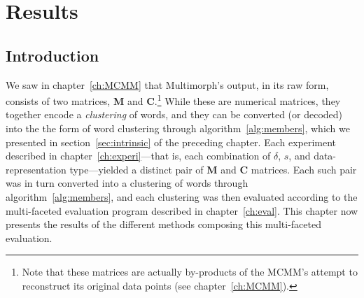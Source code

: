 \chapter{Results}
\label{ch:results}

\section{Introduction}


We saw in chapter~\ref{ch:MCMM} that Multimorph's output, in its raw form,
consists of two matrices, $\mathbf{M}$ and $\mathbf{C}$.\footnote{Note that these 
matrices are actually by-products of the MCMM's attempt to reconstruct its original 
data points (see chapter~\ref{ch:MCMM}).} While these are numerical matrices,
they together encode a \emph{clustering} of words, and they can be converted (or decoded) 
into the the form of word clustering through algorithm~\ref{alg:members}, which we presented in section~\ref{sec:intrinsic} 
of the preceding chapter. 
Each experiment described in
chapter~\ref{ch:experi}---that is, each combination of $\delta$, $s$, and 
data-representation type---yielded a distinct pair of $\mathbf{M}$ and $\mathbf{C}$ 
matrices. Each such pair was in turn converted into a clustering of words through 
algorithm~\ref{alg:members}, and each clustering was then evaluated according to the
multi-faceted evaluation program described
in chapter~\ref{ch:eval}. 
This chapter now presents the results of the different methods composing this multi-faceted evaluation.

